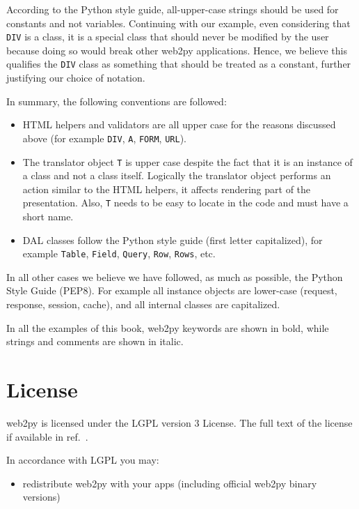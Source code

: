 \documentclass[justified,sixbynine,notoc]{tufte-book}
\def\ft{\small\tt}
\def\inxx#1{\index{#1}}
\begin{document}
\begin{fullwidth}
According to the Python style guide, all-upper-case strings should be used for constants and not
variables. Continuing with our example, even considering that {\ft DIV} is a class,
it is a special class that should never be modified by
the user because doing so would break other web2py applications.
Hence, we believe this qualifies the {\ft DIV} class as
something that should be treated as a constant, further justifying our choice of notation.

In summary, the following conventions are followed:
\begin{itemize}
\item HTML helpers and validators are all upper case for the reasons discussed above (for example {\ft DIV}, {\ft A}, {\ft FORM}, {\ft URL}).

\item The translator object {\ft T} is upper case despite the fact that it is an instance of a class and not a class itself. Logically the translator object performs an action similar to the HTML helpers, it affects rendering part of the presentation. Also, {\ft T} needs to be easy to locate in the code and must have a short name.

\item DAL classes follow the Python style guide (first letter capitalized), for example {\ft Table}, {\ft Field}, {\ft Query}, {\ft Row}, {\ft Rows}, etc.
\end{itemize}

In all other cases we believe we have followed, as much as possible,
the Python Style Guide (PEP8).
For example all instance objects are lower-case (request, response, session, cache), and all internal classes are capitalized.

In all the examples of this book, web2py keywords are shown in bold, while strings and comments are shown in italic.

\goodbreak\section{License}

\inxx{license}
\noindent web2py is licensed under the LGPL version 3 License. The full text of the license if available in ref.~\cite{lgpl3}.

In accordance with LGPL you may:

\begin{itemize}
\item redistribute web2py with your apps (including official web2py binary versions)


\end{itemize}
\end{fullwidth}
\end{document}
